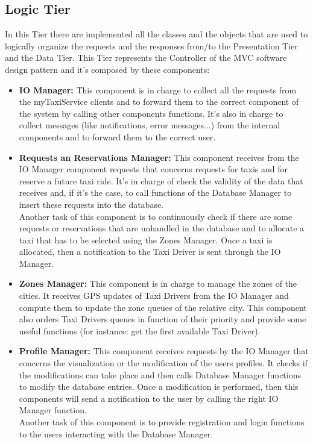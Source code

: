 \documentclass[../../../../../../dd.tex]{subfiles}
\begin{document}
	\subsection{Logic Tier}
		In this Tier there are implemented all the classes and the objects that are used to logically organize the requests and the responses from/to the Presentation Tier and the Data Tier.
		This Tier represents the Controller of the MVC software design pattern and it's composed by these components:

		\begin{itemize}
			\item \textbf{IO Manager:} This component is in charge to collect all the requests from the myTaxiService clients and to forward them to the correct component of the system by calling other components functions. It's also in charge to collect messages (like notifications, error messages...) from the internal components and to forward them to the correct user.

			\item \textbf{Requests an Reservations Manager:} This component receives from the IO Manager component requests that concerns requests for taxis and for reserve a future taxi ride. It's in charge of check the validity of the data that receives and, if it's the case, to call functions of the Database Manager to insert these requests into the database.
			\\
			Another task of this component is to continuously check if there are some requests or reservations that are unhandled in the database and to allocate a taxi that has to be selected using the Zones Manager. Once a taxi is allocated, then a notification to the Taxi Driver is sent through the IO Manager.

			\item \textbf{Zones Manager:} This component is in charge to manage the zones of the cities. It receives GPS updates of Taxi Drivers from the IO Manager and compute them to update the zone queues of the relative city. This component also orders Taxi Drivers queues in function of their priority and provide some useful functions (for instance: get the first available Taxi Driver).

			\item \textbf{Profile Manager:} This component receives requests by the IO Manager that concerns the visualization or the modification of the users profiles. It checks if the modifications can take place and then calls Database Manager functions to modify the database entries. Once a modification is performed, then this components will send a notification to the user by calling the right IO Manager function.
			\\
			Another task of this component is to provide registration and login functions to the users interacting with the Database Manager.


\end{itemize}
\end{document}
